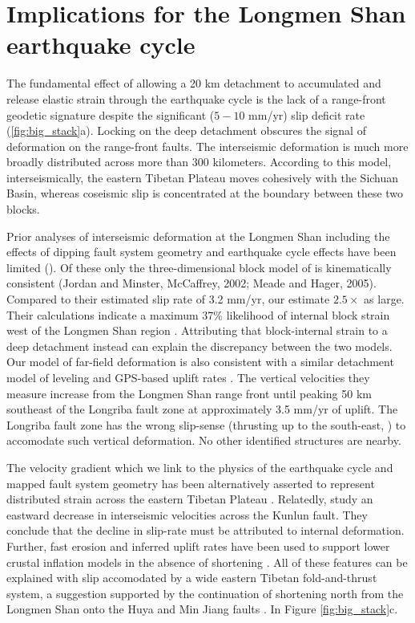 \documentclass[12pt]{article}
\begin{document}
\section{Implications for the Longmen Shan earthquake cycle}
The fundamental effect of allowing a 20 km detachment to accumulated and release elastic strain through the earthquake cycle is the lack of a range-front geodetic signature despite the significant ($5-10$ mm/yr) slip deficit rate (\ref{fig:big_stack}a). Locking on the deep detachment obscures the signal of deformation on the range-front faults. The interseismic deformation is much more broadly distributed across more than 300 kilometers. According to this model, interseismically, the eastern Tibetan Plateau moves cohesively with the Sichuan Basin, whereas coseismic slip is concentrated at the boundary between these two blocks.

Prior analyses of interseismic deformation at the Longmen Shan including the effects of dipping fault system geometry and earthquake cycle effects have been limited (\citep{Loveless2011, Qi2011, Hao2014}). Of these only the three-dimensional block model of \citet{Loveless2011} is kinematically consistent (Jordan and Minster, McCaffrey, 2002; Meade and Hager, 2005). Compared to their estimated slip rate of 3.2 mm/yr, our estimate $2.5 \times$ as large.  Their calculations indicate a maximum 37\% likelihood of internal block strain west of the Longmen Shan region \citep{Loveless2011}. Attributing that block-internal strain to a deep detachment instead can explain the discrepancy between the two models. Our model of far-field deformation is also consistent with a similar detachment model of leveling and GPS-based uplift rates \citep{Hao2014}. The vertical velocities they measure increase from the Longmen Shan range front until peaking 50 km southeast of the Longriba fault zone at approximately 3.5 mm/yr of uplift. The Longriba fault zone has the wrong slip-sense (thrusting up to the south-east, \citep{Ren2013}) to accomodate such vertical deformation. No other identified structures are nearby. 

The velocity gradient which we link to the physics of the earthquake cycle and mapped fault system geometry has been alternatively asserted to represent distributed strain across the eastern Tibetan Plateau \citep{Royden2008}. Relatedly, \citet{kirby07} study an eastward decrease in interseismic velocities across the Kunlun fault. They conclude that the decline in slip-rate must be attributed to internal deformation. Further, fast erosion and inferred uplift rates have been used to support lower crustal inflation models in the absence of shortening \citep{Kirby2003}. All of these features can be explained with slip accomodated by a wide eastern Tibetan fold-and-thrust system, a suggestion supported by the continuation of shortening north from the Longmen Shan onto the Huya \citep{kirby00} and Min Jiang faults \citep{Chen1994}. In Figure \ref{fig:big_stack}c.
\end{document}

